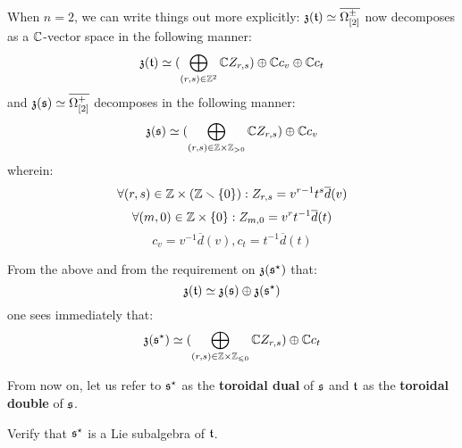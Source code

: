 \begin{remark}
                When $n = 2$, we can write things out more explicitly: $\mathfrak{z}(\mathfrak{t}) \simeq \overline{\Omega_{[2]}^{\pm}}$ now decomposes as a $\mathbb{C}$-vector space in the following manner:
                    $$\mathfrak{z}(\mathfrak{t}) \simeq ( \bigoplus_{(r, s) \in \mathbb{Z}^2} \mathbb{C} Z_{r, s}) \oplus \mathbb{C} c_v \oplus \mathbb{C} c_t$$
                and $\mathfrak{z}(\mathfrak{s}) \simeq \overline{\Omega_{[2]}^+}$ decomposes in the following manner:
                    $$\z(\s) \cong ( \bigoplus_{(r, s) \in \Z \x \Z_{> 0}} \bbC Z_{r, s}) \oplus \bbC c_v$$
                wherein:
                    $$\forall (r, s) \in \Z \x (\Z \setminus \{0\}): Z_{r, s} = v^{r - 1} t^s \overline{d}(v)$$
                    $$\forall (m, 0) \in \Z \x \{0\}: Z_{m, 0} = v^r t^{-1} \overline{d}(t)$$
                    $$c_v = v^{-1} \overline{d}(v), c_t = t^{-1} \overline{d}(t)$$

                From the above and from the requirement on $\mathfrak{z}(\mathfrak{s}^{\star})$ that:
                    $$\mathfrak{z}(\mathfrak{t}) \simeq \mathfrak{z}(\mathfrak{s}) \oplus \mathfrak{z}(\mathfrak{s}^{\star})$$
                one sees immediately that:
                    $$\z(\s^{\star}) \cong ( \bigoplus_{(r, s) \in \Z \x \Z_{\leq 0}} \bbC Z_{r, s}) \oplus \bbC c_t$$
            \end{remark}
            \begin{definition} \label{def: toroidal_duals_and_doubles}
                From now on, let us refer to $\mathfrak{s}^{\star}$ as the \textbf{toroidal dual} of $\mathfrak{s}$ and $\mathfrak{t}$ as the \textbf{toroidal double} of $\mathfrak{s}$. 
            \end{definition}
            \begin{question} \label{question: toroidal_dual}
                Verify that $\mathfrak{s}^{\star}$ is a Lie subalgebra of $\mathfrak{t}$.
            \end{question}
